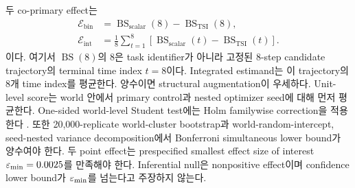 두 co-primary effect는
\[
\begin{split}
\mathcal E_{\mathrm{bin}}
&=
\operatorname{BS}_{\mathrm{scalar}}(8)
-
\operatorname{BS}_{\mathrm{TSI}}(8),\\
\mathcal E_{\mathrm{int}}
&=
\frac{1}{8}\sum_{t=1}^{8}
\left[
\operatorname{BS}_{\mathrm{scalar}}(t)
-
\operatorname{BS}_{\mathrm{TSI}}(t)
\right].
\end{split}
\]
이다. 여기서 \(\operatorname{BS}(8)\)의 8은 task identifier가 아니라 고정된
8-step candidate trajectory의 terminal time index \(t=8\)이다. Integrated
estimand는 이 trajectory의 8개 time index를 평균한다. 양수이면 structural
augmentation이 우세하다. Unit-level score는
world 안에서 primary control과 nested optimizer seed에 대해 먼저 평균한다.
One-sided world-level Student test에는 Holm familywise correction을 적용한다
\citep{holm1979simple}. 또한 20,000-replicate world-cluster bootstrap과
world-random-intercept, seed-nested variance decomposition에서 Bonferroni
simultaneous lower bound가 양수여야 한다. 두 point effect는 prespecified
smallest effect size of interest \(\varepsilon_{\mathrm{min}}=0.0025\)를 만족해야 한다. Inferential
null은 nonpositive effect이며 confidence lower bound가 \(\varepsilon_{\mathrm{min}}\)를 넘는다고
주장하지 않는다.
